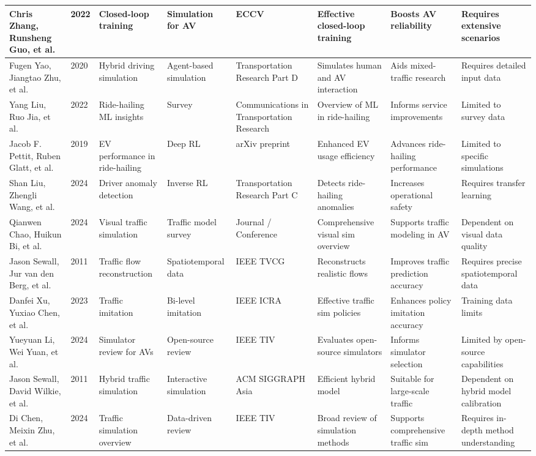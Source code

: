 \documentclass[lettersize,journal]{IEEEtran}
\begin{document}
\begin{longtable}{|p{2cm}|p{1cm}|p{2cm}|p{2cm}|p{2cm}|p{2cm}|p{2cm}|p{2.5cm}|}
\hline
Chris Zhang, Runsheng Guo, et al. & 2022 & Closed-loop training & Simulation for AV & ECCV & Effective closed-loop training & Boosts AV reliability & Requires extensive scenarios \\
\hline
Fugen Yao, Jiangtao Zhu, et al. & 2020 & Hybrid driving simulation & Agent-based simulation & Transportation Research Part D & Simulates human and AV interaction & Aids mixed-traffic research & Requires detailed input data \\
\hline
Yang Liu, Ruo Jia, et al. & 2022 & Ride-hailing ML insights & Survey & Communications in Transportation Research & Overview of ML in ride-hailing & Informs service improvements & Limited to survey data \\
\hline
Jacob F. Pettit, Ruben Glatt, et al. & 2019 & EV performance in ride-hailing & Deep RL & arXiv preprint & Enhanced EV usage efficiency & Advances ride-hailing performance & Limited to specific simulations \\
\hline
Shan Liu, Zhengli Wang, et al. & 2024 & Driver anomaly detection & Inverse RL & Transportation Research Part C & Detects ride-hailing anomalies & Increases operational safety & Requires transfer learning \\
\hline
Qianwen Chao, Huikun Bi, et al. & 2024 & Visual traffic simulation & Traffic model survey & Journal / Conference & Comprehensive visual sim overview & Supports traffic modeling in AV & Dependent on visual data quality \\
\hline
Jason Sewall, Jur van den Berg, et al. & 2011 & Traffic flow reconstruction & Spatiotemporal data & IEEE TVCG & Reconstructs realistic flows & Improves traffic prediction accuracy & Requires precise spatiotemporal data \\
\hline
Danfei Xu, Yuxiao Chen, et al. & 2023 & Traffic imitation & Bi-level imitation & IEEE ICRA & Effective traffic sim policies & Enhances policy imitation accuracy & Training data limits \\
\hline
Yueyuan Li, Wei Yuan, et al. & 2024 & Simulator review for AVs & Open-source review & IEEE TIV & Evaluates open-source simulators & Informs simulator selection & Limited by open-source capabilities \\
\hline
Jason Sewall, David Wilkie, et al. & 2011 & Hybrid traffic simulation & Interactive simulation & ACM SIGGRAPH Asia & Efficient hybrid model & Suitable for large-scale traffic & Dependent on hybrid model calibration \\
\hline
Di Chen, Meixin Zhu, et al. & 2024 & Traffic simulation overview & Data-driven review & IEEE TIV & Broad review of simulation methods & Supports comprehensive traffic sim & Requires in-depth method understanding \\

\end{longtable}
\end{document}

